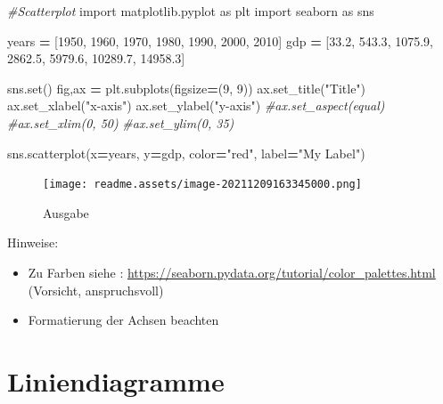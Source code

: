 \documentclass[
  oneside]{book}
\newenvironment{Shaded}{\begin{snugshade}}{\end{snugshade}}
\newcommand{\BuiltInTok}[1]{#1}
\newcommand{\CommentTok}[1]{\textcolor[rgb]{0.56,0.35,0.01}{\textit{#1}}}
\newcommand{\DecValTok}[1]{\textcolor[rgb]{0.00,0.00,0.81}{#1}}
\newcommand{\FloatTok}[1]{\textcolor[rgb]{0.00,0.00,0.81}{#1}}
\newcommand{\ImportTok}[1]{#1}
\newcommand{\NormalTok}[1]{#1}
\newcommand{\OperatorTok}[1]{\textcolor[rgb]{0.81,0.36,0.00}{\textbf{#1}}}
\newcommand{\StringTok}[1]{\textcolor[rgb]{0.31,0.60,0.02}{#1}}
\providecommand{\tightlist}{%
  \setlength{\itemsep}{0pt}\setlength{\parskip}{0pt}}
\begin{document}
\begin{Shaded}
\begin{Highlighting}[]
\CommentTok{\#Scatterplot}
\ImportTok{import}\NormalTok{ matplotlib.pyplot }\ImportTok{as}\NormalTok{ plt}
\ImportTok{import}\NormalTok{ seaborn }\ImportTok{as}\NormalTok{ sns}

\NormalTok{years }\OperatorTok{=}\NormalTok{ [}\DecValTok{1950}\NormalTok{, }\DecValTok{1960}\NormalTok{, }\DecValTok{1970}\NormalTok{, }\DecValTok{1980}\NormalTok{, }\DecValTok{1990}\NormalTok{, }\DecValTok{2000}\NormalTok{, }\DecValTok{2010}\NormalTok{]}
\NormalTok{gdp }\OperatorTok{=}\NormalTok{ [}\FloatTok{33.2}\NormalTok{, }\FloatTok{543.3}\NormalTok{, }\FloatTok{1075.9}\NormalTok{, }\FloatTok{2862.5}\NormalTok{, }\FloatTok{5979.6}\NormalTok{, }\FloatTok{10289.7}\NormalTok{, }\FloatTok{14958.3}\NormalTok{]}

\NormalTok{sns.}\BuiltInTok{set}\NormalTok{()}
\NormalTok{fig,ax }\OperatorTok{=}\NormalTok{ plt.subplots(figsize}\OperatorTok{=}\NormalTok{(}\DecValTok{9}\NormalTok{, }\DecValTok{9}\NormalTok{))}
\NormalTok{ax.set\_title(}\StringTok{"Title"}\NormalTok{) }
\NormalTok{ax.set\_xlabel(}\StringTok{"x{-}axis"}\NormalTok{)}
\NormalTok{ax.set\_ylabel(}\StringTok{"y{-}axis"}\NormalTok{)}
\CommentTok{\#ax.set\_aspect(\textquotesingle{}equal\textquotesingle{})}
\CommentTok{\#ax.set\_xlim(0, 50)}
\CommentTok{\#ax.set\_ylim(0, 35)}

\NormalTok{sns.scatterplot(x}\OperatorTok{=}\NormalTok{years, y}\OperatorTok{=}\NormalTok{gdp, color}\OperatorTok{=}\StringTok{"red"}\NormalTok{, label}\OperatorTok{=}\StringTok{"My Label"}\NormalTok{)          }
\end{Highlighting}
\end{Shaded}

\begin{figure}
\centering
\texttt{[image: readme.assets/image-20211209163345000.png]}
\caption{Ausgabe}
\end{figure}

Hinweise:

\begin{itemize}
\tightlist
\item
  Zu Farben siehe : \url{https://seaborn.pydata.org/tutorial/color_palettes.html} (Vorsicht, anspruchsvoll)
\item
  Formatierung der Achsen beachten
\end{itemize}

\hypertarget{liniendiagramme}{%
\section{Liniendiagramme}\label{liniendiagramme}}
\end{document}
